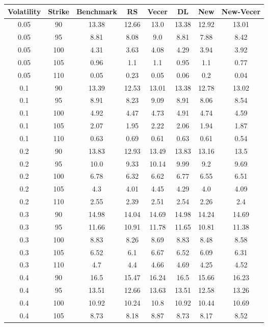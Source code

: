 \documentclass{article}
\begin{document}
\scriptsize
\begin{table}[H]
  \begin{tabular}{|c|c|c|c|c|c|c|c|}
  \hline
  Volatility & Strike & Benchmark & RS & Vecer & DL & New & New-Vecer \\
  \hline
  0.05 & 90 & 13.38 & 12.66 & 13.0 & 13.38 & 12.92 & 13.01 \\
  0.05 & 95 & 8.81 & 8.08 & 9.0 & 8.81 & 7.88 & 8.42 \\
  0.05 & 100 & 4.31 & 3.63 & 4.08 & 4.29 & 3.94 & 3.92 \\
  0.05 & 105 & 0.96 & 1.1 & 1.1 & 0.95 & 1.1 & 0.77 \\
  0.05 & 110 & 0.05 & 0.23 & 0.05 & 0.06 & 0.2 & 0.04 \\
  0.1 & 90 & 13.39 & 12.53 & 13.01 & 13.38 & 12.78 & 13.02 \\
  0.1 & 95 & 8.91 & 8.23 & 9.09 & 8.91 & 8.06 & 8.54 \\
  0.1 & 100 & 4.92 & 4.47 & 4.73 & 4.91 & 4.74 & 4.59 \\
  0.1 & 105 & 2.07 & 1.95 & 2.22 & 2.06 & 1.94 & 1.87 \\
  0.1 & 110 & 0.63 & 0.69 & 0.61 & 0.63 & 0.61 & 0.54 \\
  0.2 & 90 & 13.83 & 12.93 & 13.49 & 13.83 & 13.16 & 13.5 \\
  0.2 & 95 & 10.0 & 9.33 & 10.14 & 9.99 & 9.2 & 9.69 \\
  0.2 & 100 & 6.78 & 6.32 & 6.62 & 6.77 & 6.55 & 6.51 \\
  0.2 & 105 & 4.3 & 4.01 & 4.45 & 4.29 & 4.0 & 4.09 \\
  0.2 & 110 & 2.55 & 2.39 & 2.51 & 2.54 & 2.26 & 2.4 \\
  0.3 & 90 & 14.98 & 14.04 & 14.69 & 14.98 & 14.24 & 14.69 \\
  0.3 & 95 & 11.66 & 10.91 & 11.78 & 11.65 & 10.81 & 11.38 \\
  0.3 & 100 & 8.83 & 8.26 & 8.69 & 8.83 & 8.48 & 8.58 \\
  0.3 & 105 & 6.52 & 6.1 & 6.67 & 6.52 & 6.09 & 6.31 \\
  0.3 & 110 & 4.7 & 4.4 & 4.66 & 4.69 & 4.25 & 4.52 \\
  0.4 & 90 & 16.5 & 15.47 & 16.24 & 16.5 & 15.66 & 16.23 \\
  0.4 & 95 & 13.51 & 12.66 & 13.63 & 13.51 & 12.58 & 13.26 \\
  0.4 & 100 & 10.92 & 10.24 & 10.8 & 10.92 & 10.44 & 10.69 \\
  0.4 & 105 & 8.73 & 8.18 & 8.87 & 8.73 & 8.17 & 8.52 \\

\end{tabular}
\end{table}
\end{document}
